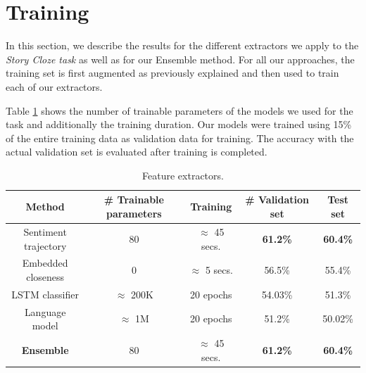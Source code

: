 \documentclass{article}
\begin{document}
\section{Training}
\label{sec:training}

In this section, we describe the results for the different extractors we apply
to the {\it Story Cloze task} as well as for our Ensemble method. For all our
approaches, the training set is first augmented as previously explained and then
used to train each of our extractors.

Table \ref{tab:params} shows the number of trainable parameters of the models we
used for the task and additionally the training duration. Our models were
trained using 15\% of the entire training data as validation data for training.
The accuracy with the actual validation set is evaluated after training is
completed. 

\begin{table}
    \caption{Feature extractors.}
    \begin{center}
        \label{tab:params}
        \begin{tabular}{||c c c c c||} 
            \hline
            Method                 & \# Trainable parameters   & Training               & \# Validation set         & Test set \\ [0.5ex] 
            \hline\hline
            Sentiment trajectory   & 80                        & $ \approx $ 45 secs.   & \textbf{61.2\%}           & \textbf{60.4\%} \\ 
            \hline
            Embedded closeness     & 0                         & $ \approx $ 5 secs.    & 56.5\%                    & 55.4\% \\
            \hline
            LSTM classifier        & $ \approx $ 200K          & 20 epochs              & 54.03\%                   & 51.3\% \\ 
            \hline
            Language model         & $ \approx $ 1M            & 20 epochs              & 51.2\%                    & 50.02\% \\
            \hline
            \textbf{Ensemble}      & 80                        & $ \approx $ 45 secs.   & \textbf{61.2\%}           & \textbf{60.4\%} \\ [1ex] 
            \hline
        \end{tabular}
    \end{center}
\end{table}
\end{document}
